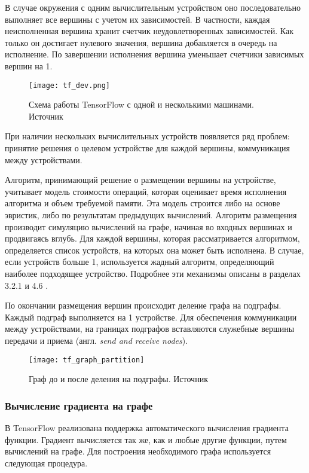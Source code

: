 В случае окружения с одним вычислительным устройством оно последовательно
выполняет все вершины с учетом их зависимостей. В частности, каждая
неисполненная вершина хранит счетчик неудовлетворенных зависимостей. Как только
он достигает нулевого значения, вершина добавляется в очередь на исполнение.
По завершении исполнения вершина уменьшает счетчики зависимых вершин на 1.

\begin{figure}[h]
    \centering
    \texttt{[image: tf\_dev.png]}
    \caption{Схема работы TensorFlow с одной и несколькими машинами. Источник \cite{Abadi2016}}
    \label{fig:tf_dev}
\end{figure}

При наличии нескольких вычислительных устройств появляется ряд проблем: принятие
решения о целевом устройстве для каждой вершины, коммуникация между устройствами.

Алгоритм, принимающий решение о размещении вершины на устройстве, учитывает
модель стоимости операций, которая оценивает время исполнения алгоритма и
объем требуемой памяти. Эта модель строится либо на основе эвристик, либо
по результатам предыдущих вычислений. Алгоритм размещения производит симуляцию
вычислений на графе, начиная во входных вершинах и продвигаясь вглубь. Для
каждой вершины, которая рассматривается алгоритмом, определяется список устройств,
на которых она может быть исполнена. В случае, если устройств больше 1,
используется жадный алгоритм, определяющий наиболее подходящее устройство.
Подробнее эти механизмы описаны в разделах 3.2.1 и 4.6 \cite{Abadi2016}.

По окончании размещения вершин происходит деление графа на подграфы. Каждый
подграф выполняется на 1 устройстве. Для обеспечения коммуникации между
устройствами, на границах подграфов вставляются служебные вершины передачи и
приема (англ. \textit{send and receive nodes}).

\begin{figure}[h]
    \centering
    \texttt{[image: tf\_graph\_partition]}
    \caption{Граф до и после деления на подграфы. Источник \cite{Abadi2016}}
    \label{fig:tf_graph_partition}
\end{figure}

\subsubsection{Вычисление градиента на графе}

В TensorFlow реализована поддержка автоматического вычисления градиента функции.
Градиент вычисляется так же, как и любые другие функции, путем вычислений на
графе. Для построения необходимого графа используется следующая процедура.

